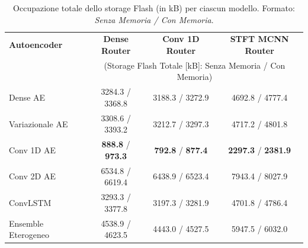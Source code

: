 \begin{table}[H]
	\centering
	\begin{tabular}{lccc}
		\toprule
		\textbf{Autoencoder} & \textbf{Dense Router} & \textbf{Conv 1D Router} & \textbf{STFT MCNN Router} \\
		& \multicolumn{3}{c}{\small (Storage Flash Totale [kB]: Senza Memoria / Con Memoria)} \\
		\midrule
		Dense AE            & 3284.3 / 3368.8 & 3188.3 / 3272.9 & 4692.8 / 4777.4 \\
		Variazionale AE     & 3308.6 / 3393.2 & 3212.7 / 3297.3 & 4717.2 / 4801.8 \\
		Conv 1D AE          & \textbf{888.8} / \textbf{973.3} & \textbf{792.8} / \textbf{877.4} & \textbf{2297.3} / \textbf{2381.9} \\
		Conv 2D AE          & 6534.8 / 6619.4 & 6438.9 / 6523.4 & 7943.4 / 8027.9 \\
		ConvLSTM            & 3293.3 / 3377.8 & 3197.3 / 3281.9 & 4701.8 / 4786.4 \\
		Ensemble Eterogeneo & 4538.9 / 4623.5 & 4443.0 / 4527.5 & 5947.5 / 6032.0 \\
		\bottomrule
	\end{tabular}
	\caption{Occupazione totale dello storage Flash (in kB) per ciascun modello. Formato: \emph{Senza Memoria / Con Memoria}.}
	\label{tab:benchmark_storage_summary}
\end{table}




